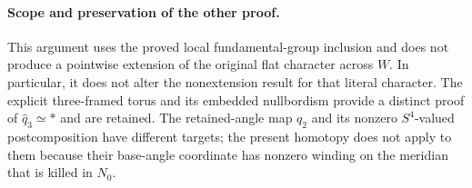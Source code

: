 \paragraph{Scope and preservation of the other proof.}
This argument uses the proved local fundamental-group inclusion and does
not produce a pointwise extension of the original flat character across
$W$. In particular, it does not alter the nonextension result for that
literal character. The explicit three-framed torus and its embedded
nullbordism provide a distinct proof of $\widehat q_3\simeq*$ and
are retained. The retained-angle map $q_2$ and its nonzero
$S^4$-valued postcomposition have different targets; the present
homotopy does not apply to them because their base-angle coordinate has
nonzero winding on the meridian that is killed in $N_0$.
